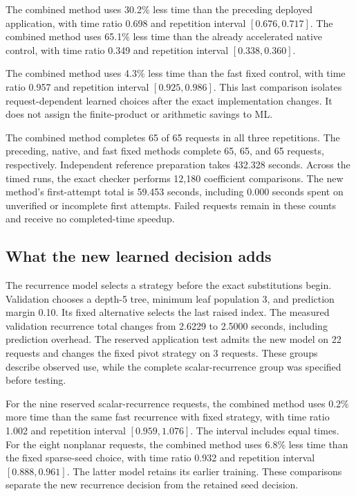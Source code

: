 The combined method uses 30.2\% less time than the preceding deployed application, with time ratio 0.698 and repetition interval $[0.676,0.717]$. The combined method uses 65.1\% less time than the already accelerated native control, with time ratio 0.349 and repetition interval $[0.338,0.360]$.

The combined method uses 4.3\% less time than the fast fixed control, with time ratio 0.957 and repetition interval $[0.925,0.986]$. This last comparison isolates request-dependent learned choices after the exact implementation changes. It does not assign the finite-product or arithmetic savings to ML.

The combined method completes 65 of 65 requests in all three repetitions. The preceding, native, and fast fixed methods complete 65, 65, and 65 requests, respectively. Independent reference preparation takes 432.328 seconds. Across the timed runs, the exact checker performs 12,180 coefficient comparisons. The new method's first-attempt total is 59.453 seconds, including 0.000 seconds spent on unverified or incomplete first attempts. Failed requests remain in these counts and receive no completed-time speedup.

\subsection{What the new learned decision adds}
The recurrence model selects a strategy before the exact substitutions begin. Validation chooses a depth-5 tree, minimum leaf population 3, and prediction margin 0.10. Its fixed alternative selects the last raised index. The measured validation recurrence total changes from 2.6229 to 2.5000 seconds, including prediction overhead. The reserved application test admits the new model on 22 requests and changes the fixed pivot strategy on 3 requests. These groups describe observed use, while the complete scalar-recurrence group was specified before testing.

For the nine reserved scalar-recurrence requests, the combined method uses 0.2\% more time than the same fast recurrence with fixed strategy, with time ratio 1.002 and repetition interval $[0.959,1.076]$. The interval includes equal times. For the eight nonplanar requests, the combined method uses 6.8\% less time than the fixed sparse-seed choice, with time ratio 0.932 and repetition interval $[0.888,0.961]$. The latter model retains its earlier training. These comparisons separate the new recurrence decision from the retained seed decision.

